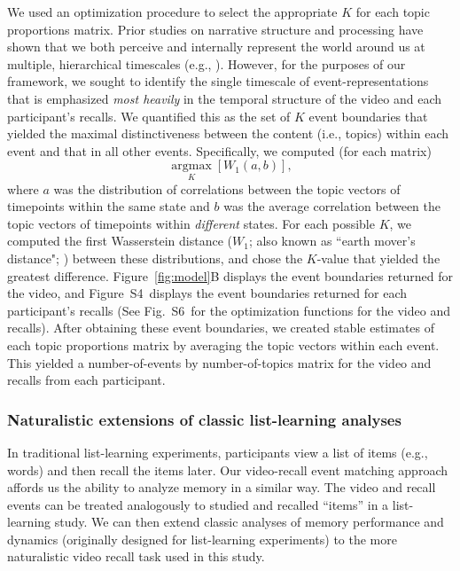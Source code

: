 \documentclass{article}
\newcommand{\argmax}{\mathop{\mathrm{argmax}}\limits}
\newcommand{\corrmats}{S4}
\newcommand{\kopt}{S6}
\begin{document}
We used an optimization procedure to select the appropriate $K$ for each topic proportions matrix.  Prior studies on narrative structure and processing have shown that we both perceive and internally represent the world around us at multiple, hierarchical timescales (e.g., \citealp{HassEtal08, LernEtal11, HassEtal15, ChenEtal17, BaldEtal17, BaldEtal18}).  However, for the purposes of our framework, we sought to identify the single timescale of event-representations that is emphasized \textit{most heavily} in the temporal structure of the video and each participant's recalls.  We quantified this as the set of $K$ event boundaries that yielded the maximal distinctiveness between the content (i.e., topics) within each event and that in all other events. Specifically, we computed (for each matrix)
\[
  \argmax_K \left[W_{1}(a, b)\right],
\]
where $a$ was the distribution of correlations between the topic vectors of timepoints within the same state and $b$ was the average correlation between the topic vectors of timepoints within \textit{different} states.  For each possible $K$, we computed the first Wasserstein distance ($W_{1}$; also known as ``earth mover's distance"; \citealp{Dobr70, RamdEtal17}) between these distributions, and chose the $K$-value that yielded the greatest difference.  Figure~\ref{fig:model}B displays the event boundaries returned for the video, and Figure~\corrmats~displays the event boundaries returned for each participant's recalls (See Fig.~\kopt~for the optimization functions for the video and recalls).  After obtaining these event boundaries, we created stable estimates of each topic proportions matrix by averaging the topic vectors within each event.  This yielded a number-of-events by number-of-topics matrix for the video and recalls from each participant.

\subsubsection*{Naturalistic extensions of classic list-learning analyses}
In traditional list-learning experiments, participants view a list of items (e.g., words) and then recall the items later.  Our video-recall event matching approach affords us the ability to analyze memory in a similar way. The video and recall events can be treated analogously to studied and recalled ``items'' in a list-learning study.  We can then extend classic analyses of memory performance and dynamics (originally designed for list-learning experiments) to the more naturalistic video recall task used in this study.
\end{document}
